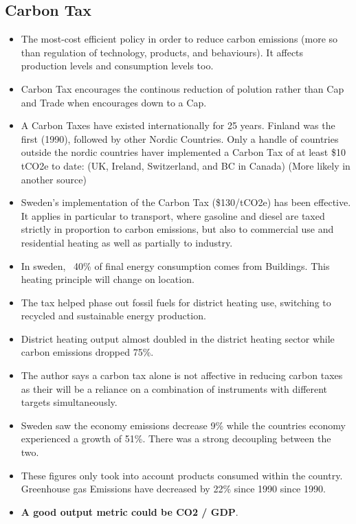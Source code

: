 \documentclass[12pt]{article}
\begin{document}
    \subsection{Carbon Tax}
    \begin{itemize}
        \item The most-cost efficient policy in order to reduce carbon emissions (more so than regulation of technology, products, and behaviours). It affects production levels and consumption levels too.
        \item Carbon Tax encourages the continous reduction of polution rather than Cap and Trade when encourages down to a Cap.
        \item A Carbon Taxes have existed internationally for 25 years. Finland was the first (1990), followed by other Nordic Countries. Only a handle of countries outside
              the nordic countries haver implemented a Carbon Tax of at least \$10 tCO2e to date: (UK, Ireland, Switzerland, and BC in Canada) (More likely in another source)
        \item Sweden's implementation of the Carbon Tax (\$130/tCO2e) has been effective. It applies in particular to transport, where gasoline and diesel are taxed strictly in
              proportion to carbon emissions, but also to commercial use and residential heating as well as partially to industry.
        \item In sweden, ~40\% of final energy consumption comes from Buildings. This heating principle will change on location.
        \item The tax helped phase out fossil fuels for district heating use, switching to recycled and sustainable energy production.
        \item District heating output almost doubled in the district heating sector while carbon emissions dropped 75\%. 
        \item The author says a carbon tax alone is not affective in reducing carbon taxes as their will be a reliance on a combination of instruments with different targets simultaneously.
        \item Sweden saw the economy emissions decrease 9\% while the countries economy experienced a growth of 51\%. There was a strong decoupling between the two.
        \item These figures only took into account products consumed within the country. Greenhouse gas Emissions have decreased by 22\% since 1990 since 1990.
        \item \textbf{A good output metric could be CO2 / GDP}.
    \end{itemize}
\end{document}
